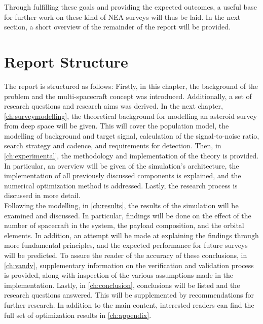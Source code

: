 Through fulfilling these goals and providing the expected outcomes, a useful base for further work on these kind of NEA surveys will thus be laid. In the next section, a short overview of the remainder of the report will be provided.

\section{Report Structure}
\label{sec:reportstructure}
The report is structured as follows: Firstly, in this chapter, the background of the problem and the multi-spacecraft concept was introduced. Additionally, a set of research questions and research aims was derived. In the next chapter, \autoref{ch:surveymodelling}, the theoretical background for modelling an asteroid survey from deep space will be given. This will cover the population model, the modelling of background and target signal, calculation of the signal-to-noise ratio, search strategy and cadence, and requirements for detection. Then, in \autoref{ch:experimental}, the methodology and implementation of the theory is provided. In particular, an overview will be given of the simulation's architecture, the implementation of all previously discussed components is explained, and the numerical optimization method is addressed. Lastly, the research process is discussed in more detail. \\

Following the modelling, in \autoref{ch:results}, the results of the simulation will be examined and discussed. In particular, findings will be done on the effect of the number of spacecraft in the system, the payload composition, and the orbital elements. In addition, an attempt will be made at explaining the findings through more fundamental principles, and the expected performance for future surveys will be predicted. To assure the reader of the accuracy of these conclusions, in \autoref{ch:vandv}, supplementary information on the verification and validation process is provided, along with inspection of the various assumptions made in the implementation. Lastly, in \autoref{ch:conclusion}, conclusions will be listed and the research questions answered. This will be supplemented by recommendations for further research. In addition to the main content, interested readers can find the full set of optimization results in \autoref{ch:appendix}.
